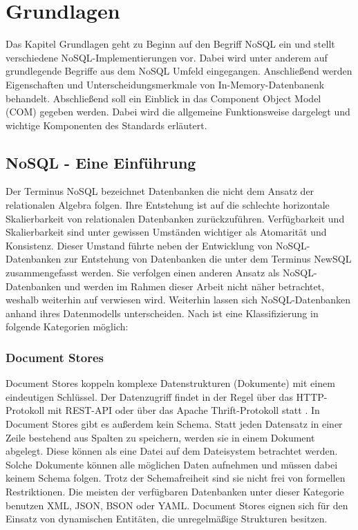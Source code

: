 
\chapter{Grundlagen}
\label{ch:grundlagen}

Das Kapitel Grundlagen geht zu Beginn auf den Begriff NoSQL ein und stellt  verschiedene NoSQL-Implementierungen vor. Dabei wird unter anderem auf grundlegende Begriffe aus dem NoSQL Umfeld eingegangen. Anschließend werden Eigenschaften und Unterscheidungsmerkmale von In-Memory-Datenbanenk behandelt. Abschließend soll ein Einblick in das Component Object Model (COM) gegeben werden. Dabei wird die allgemeine Funktionsweise dargelegt und wichtige Komponenten des Standards erläutert.

\section{NoSQL - Eine Einführung}
\label{ch:grundlagen:sec:NoSQL}

Der Terminus NoSQL bezeichnet Datenbanken die nicht dem Ansatz der relationalen Algebra folgen. Ihre Entstehung ist auf die schlechte horizontale Skalierbarkeit von relationalen Datenbanken zurückzuführen. Verfügbarkeit und Skalierbarkeit sind unter gewissen Umständen wichtiger als Atomarität und Konsistenz. Dieser Umstand führte neben der Entwicklung von NoSQL-Datenbanken zur Entstehung von Datenbanken die unter dem Terminus NewSQL zusammengefasst werden. Sie verfolgen einen anderen Ansatz als NoSQL-Datenbanken und werden im Rahmen dieser Arbeit nicht näher betrachtet, weshalb weiterhin auf \cite{NewSQL2011} verwiesen wird. Weiterhin lassen sich NoSQL-Datenbanken anhand ihres Datenmodells unterscheiden. Nach \cite{vaish2013getting} ist eine Klassifizierung in folgende Kategorien möglich:

\subsection{Document Stores}
\label{ch:grundlagen:sec:NoSQL:DocumentStores}

Document Stores koppeln komplexe Datenstrukturen (Dokumente) mit einem eindeutigen Schlüssel. Der Datenzugriff findet in der Regel über das HTTP-Protokoll mit REST-API oder über das Apache Thrift-Protokoll statt \cite{agarwal2007thrift}. In Document Stores gibt es außerdem kein Schema. Statt jeden Datensatz in einer Zeile bestehend aus Spalten zu speichern, werden sie in einem Dokument abgelegt. Diese können als eine Datei auf dem Dateisystem betrachtet werden. Solche Dokumente können alle möglichen Daten aufnehmen und müssen dabei keinem Schema folgen. Trotz der Schemafreiheit sind sie nicht frei von formellen Restriktionen. Die meisten der verfügbaren Datenbanken unter dieser Kategorie benutzen XML, JSON, BSON oder YAML. Document Stores eignen sich für den Einsatz von dynamischen Entitäten, die unregelmäßige Strukturen besitzen.

